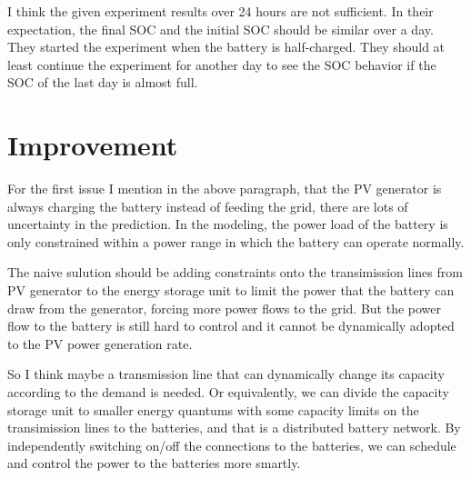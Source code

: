 \documentclass[11pt]{article}
\begin{document}
I think the given experiment results over 24 hours are not sufficient. In their expectation, the final SOC and the initial SOC should be similar over a day. They started the experiment when the battery is half-charged. They should at least continue the experiment for another day to see the SOC behavior if the SOC of the last day is almost full.

\section{Improvement}
For the first issue I mention in the above paragraph, that the PV generator is always charging the battery instead of feeding the grid, there are lots of uncertainty in the prediction. In the modeling, the power load of the battery is only constrained within a power range in which the battery can operate normally. 

The naive sulution should be adding constraints onto the transimission lines from PV generator to the energy storage unit to limit the power that the battery can draw from the generator, forcing more power flows to the grid. But the power flow to the battery is still hard to control and it cannot be dynamically adopted to the PV power generation rate.

So I think maybe a transmission line that can dynamically change its capacity according to the demand is needed. Or equivalently, we can divide the capacity storage unit to smaller energy quantums with some capacity limits on the transimission lines to the batteries, and that is a distributed battery network. By independently switching on/off the connections to the batteries, we can schedule and control the power to the batteries more smartly.
\end{document}
